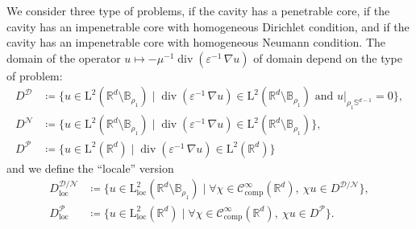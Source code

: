 \documentclass[12pt,a4paper]{article}
\theoremstyle{definition}
\theoremstyle{plain}
\theoremstyle{remark}
\newcommand{\bbB}{\mathbb{B}}
\newcommand{\bbR}{\mathbb{R}}
\newcommand{\bbS}{\mathbb{S}}
\newcommand{\calD}{\mathcal{D}}
\newcommand{\calN}{\mathcal{N}}
\newcommand{\calP}{\mathcal{P}}
\newcommand{\scrC}{\mathscr{C}}
\newcommand{\rmL}{\mathrm{L}}
\DeclareMathOperator{\Div}{div}
\newcommand{\restr}[2]{\left. #1\right\vert_{#2}}
\newcommand{\eps}{\varepsilon}
\newcommand{\comp}{\mathrm{comp}}
\newcommand{\loc}{\mathrm{loc}}
\begin{document}
We consider three type of problems, if the cavity has a penetrable core, if the cavity has an impenetrable core with homogeneous Dirichlet condition, and if the cavity has an impenetrable core with homogeneous Neumann condition.
The domain of the operator $u \mapsto -\mu^{-1}\Div(\eps^{-1}\, \nabla u)$ of domain depend on the type of problem:
\begin{align*}
    D^\calD & \coloneqq \{u \in \rmL^2(\bbR^d \setminus \bbB_{\rho_1}) \mid \Div(\eps^{-1}\, \nabla u) \in \rmL^2(\bbR^d \setminus \bbB_{\rho_1}) \text{ and } \restr{u}{\rho_1\bbS^{d-1}} = 0\}, \\
    D^\calN & \coloneqq \{u \in \rmL^2(\bbR^d \setminus \bbB_{\rho_1}) \mid \Div(\eps^{-1}\, \nabla u) \in \rmL^2(\bbR^d \setminus \bbB_{\rho_1})\},                                              \\
    D^\calP & \coloneqq \{u \in \rmL^2(\bbR^d) \mid \Div(\eps^{-1}\, \nabla u) \in \rmL^2(\bbR^d)\}
\end{align*}
and we define the ``locale'' version
\begin{align*}
    D_\loc^{\calD/\calN} & \coloneqq \{u \in \rmL_\loc^2(\bbR^d \setminus \bbB_{\rho_1}) \mid \forall \chi \in \scrC_\comp^\infty(\bbR^d),\ \chi u \in D^{\calD/\calN}\}, \\
    D_\loc^\calP         & \coloneqq \{u \in \rmL_\loc^2(\bbR^d) \mid \forall \chi \in \scrC_\comp^\infty(\bbR^d),\ \chi u \in D^\calP\}.
\end{align*}

\bigskip
\end{document}
